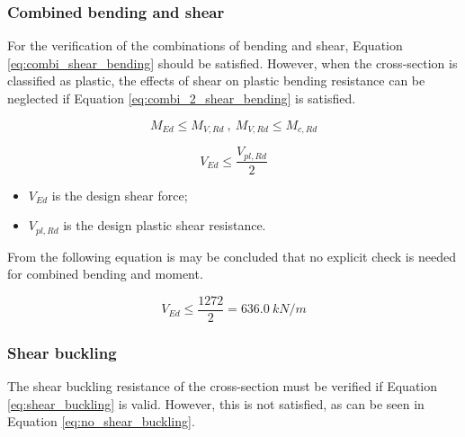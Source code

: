 

\subsubsection{Combined bending and shear}

For the verification of the combinations of bending and shear, Equation \ref{eq:combi_shear_bending} should be satisfied. However, when the cross-section is classified as plastic, the effects of shear on plastic bending resistance can be neglected if Equation \ref{eq:combi_2_shear_bending} is satisfied. 

\begin{equation}
    M_{Ed} \leq M_{V,Rd} \ , \ M_{V,Rd} \leq M_{c,Rd}
    \label{eq:combi_shear_bending}
\end{equation}

\begin{equation}
    V_{Ed} \leq \frac{V_{pl,Rd}}{2}
    \label{eq:combi_2_shear_bending}
\end{equation}

\begin{itemize}
  \item $V_{Ed}$ is the design shear force;
  \item $V_{pl,Rd}$ is the design plastic shear resistance.
\end{itemize}

From the following equation is may be concluded that no explicit check is needed for combined bending and moment. 

\begin{equation}
    V_{Ed} \leq \frac{1272}{2} = 636.0 \ kN/m 
\end{equation}

\subsubsection{Shear buckling}

The shear buckling resistance of the cross-section must be verified if Equation \ref{eq:shear_buckling} is valid. However, this is not satisfied, as can be seen in Equation \ref{eq:no_shear_buckling}.

